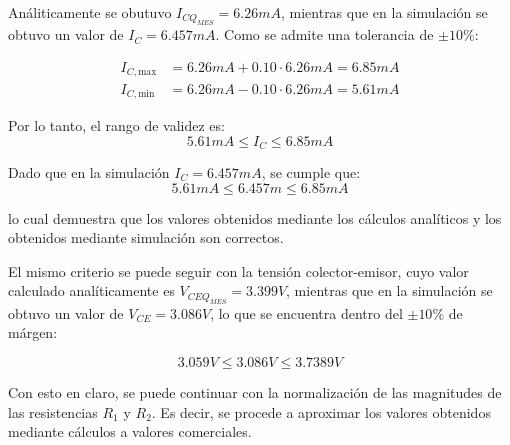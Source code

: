 Análiticamente se obutuvo $I_{CQ_{MES}} = 6.26mA$, mientras que en la simulación se obtuvo un valor de $I_C = 6.457mA$.
Como se admite una tolerancia de $\pm 10\%$:

\begin{align*}
I_{C,\text{max}} &= 6.26mA + 0.10 \cdot 6.26mA = 6.85mA \\
I_{C,\text{min}} &= 6.26mA - 0.10 \cdot 6.26mA = 5.61mA
\end{align*}

Por lo tanto, el rango de validez es:
\[
5.61mA \leq I_C \leq 6.85mA
\]

Dado que en la simulación $I_C = 6.457mA$, se cumple que:
\[
5.61mA \leq 6.457m \leq 6.85mA
\]

lo cual demuestra que los valores obtenidos mediante los cálculos analíticos y los 
obtenidos mediante simulación son correctos.

El mismo criterio se puede seguir con la tensión colector-emisor, cuyo valor calculado analíticamente es
$V_{CEQ_{MES}} = 3.399V$, mientras que en la simulación se obtuvo un valor de $V_{CE} = 3.086V$, lo que se
encuentra dentro del $\pm 10\%$ de márgen:

\[
3.059V \leq 3.086V \leq 3.7389V
\]

Con esto en claro, se puede continuar con la normalización de las magnitudes
de las resistencias $R_1$ y $R_2$. Es decir, se procede a aproximar los valores obtenidos 
mediante cálculos a valores comerciales.
